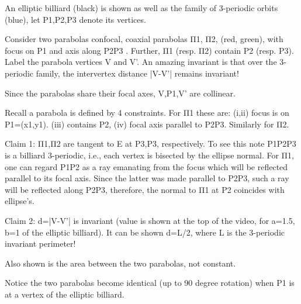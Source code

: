 An elliptic billiard (black) is shown as well as the family of 3-periodic orbits (blue), let P1,P2,P3 denote its vertices.

Consider two parabolas confocal, coaxial parabolas Π1, Π2, (red, green), with focus on P1 and axis along P2P3 . Further, Π1 (resp. Π2) contain P2 (resp. P3). Label the parabola vertices V and V'. An amazing invariant is that over the 3-periodic family, the intervertex distance |V-V'| remains invariant!

Since the parabolas share their focal axes, V,P1,V' are collinear.

Recall a parabola is defined by 4 constraints. For Π1 these are: (i,ii) focus is on P1=(x1,y1). (iii) contains P2, (iv) focal axis parallel to P2P3. Similarly for Π2.

Claim 1: Π1,Π2 are tangent to E at P3,P3, respectively. To see this note P1P2P3 is a billiard 3-periodic, i.e., each vertex is bisected by the ellipse normal. For Π1, one can regard P1P2 as a ray emanating from the focus which will be reflected parallel to its focal axis. Since the latter was made parallel to P2P3, such a ray will be reflected along P2P3, therefore, the normal to Π1 at P2 coincides with ellipse's.

Claim 2: d=|V-V'| is invariant (value is shown at the top of the video, for a=1.5, b=1 of the elliptic billiard). It can be shown d=L/2, where L is the 3-periodic invariant perimeter!

Also shown is the area between the two parabolas, not constant.

Notice the two parabolas become identical (up to 90 degree rotation) when P1 is at a vertex of the elliptic billiard.